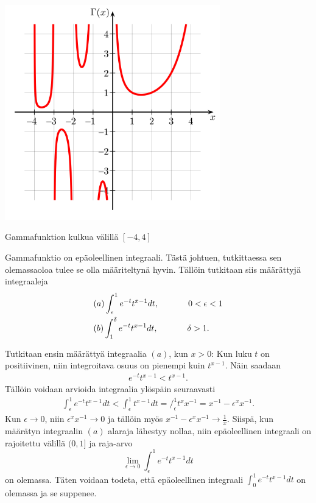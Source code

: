 \documentclass[12pt]{article}
\theoremstyle{definition}
\theoremstyle{plain}
\numberwithin{equation}{section}
\begin{document}
\begin{center}
\includegraphics[width=0.7\textwidth]{Gamma-function.png} \newline
\caption{Gammafunktion kulkua välillä $[-4,4]$}
\end{center}

Gammafunktio on epäoleellinen integraali. Tästä johtuen, tutkittaessa sen olemassaoloa tulee se olla määriteltynä hyvin. Tällöin tutkitaan siis määrättyjä integraaleja
\begin{align*}
    &(a) \int_{\epsilon}^{1} e^{-t} t^{x-1} dt, \hspace{0.1\textwidth} 0<\epsilon<1 \\
    & (b) \int_{1}^{\delta} e^{-t} t^{x-1} dt, \hspace{0.1\textwidth} \delta>1.
\end{align*}

Tutkitaan ensin määrättyä integraalia $(a)$, kun $x>0$:\newline
Kun luku $t$ on positiivinen, niin integroitava osuus on pienempi kuin $t^{x-1}$. Näin saadaan
\begin{align*}
    e^{-t} t^{x-1} < t^{x-1}.
\end{align*} 
Tällöin voidaan arvioida integraalia ylöspäin seuraavasti 
\begin{align*}
    \int_{\epsilon}^{1} e^{-t} t^{x-1} dt < \int_{\epsilon}^{1} t^{x-1} dt = \Big/_\epsilon^1 {t^x}x^{-1} = {x}^{-1}-\epsilon^{x}{x}^{-1}.
\end{align*}
Kun $\epsilon \rightarrow 0$, niin $\epsilon^{x}x^{-1}\rightarrow 0$ ja tällöin myös $x^{-1}-\epsilon{^x}x^{-1} \rightarrow \frac{1}{x}$. Siispä, kun määrätyn integraalin $(a)$ alaraja lähestyy nollaa, niin epäoleellinen integraali on  rajoitettu välillä $(0, 1]$ ja raja-arvo
\begin{equation*}
    \lim_{\epsilon\to0}\int_{\epsilon}^{1}e^{-t}t^{x-1}dt
\end{equation*}
on olemassa. Täten voidaan todeta, että epäoleellinen integraali $\int_{0}^{1} e^{-t} t^{x-1} dt$ on olemassa ja se suppenee. \newline
\end{document}
